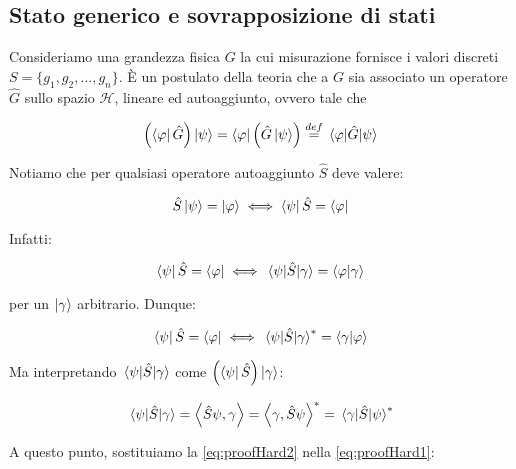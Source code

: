 \subsection{Stato generico e sovrapposizione di stati}

Consideriamo una grandezza fisica $G$ la cui misurazione fornisce i valori discreti $S = \{g_1, g_2, ..., g_n\}$. \`E un postulato della teoria che a $G$ sia associato un operatore $\hat{G}$ sullo spazio $\mathcal{H}$, lineare ed autoaggiunto, ovvero tale che

    \begin{equation}
        \left ( \bra{\varphi} \hat{G} \right ) \ket{\psi} =
        \bra{\varphi} \left ( \hat{G} \ket{\psi} \right ) \overset{def}{=}
        \mel{\varphi}{\hat{G}}{\psi}
    \end{equation}

Notiamo che per qualsiasi operatore autoaggiunto $\hat{S}$ deve valere:
    
    \begin{equation} \label{eq:proofHard0}
        \hat{S} \ket{\psi} = \ket{\varphi} \iff \bra{\psi} \hat{S} = \bra{\varphi}
    \end{equation}
    
Infatti:

    \begin{equation} \label{eq:proofHard1}
        \bra{\psi} \hat{S} = \bra{\varphi} \iff 
        \mel{\psi}{\hat{S}}{\gamma} = \braket{\varphi}{\gamma} 
	\end{equation}

per un $\ket{\gamma}$ arbitrario. Dunque:

	\begin{equation}
		\bra{\psi} \hat{S} = \bra{\varphi} \iff
        \mel{\psi}{\hat{S}}{\gamma}^* = \braket{\gamma}{\varphi}
    \end{equation}  
    
Ma interpretando $\mel{\psi}{\hat{S}}{\gamma}$ come $\left ( \bra{\psi} \hat{S} \right ) \ket{\gamma}$:

    \begin{equation} \label{eq:proofHard2}
        \mel{\psi}{\hat{S}}{\gamma} = \left \langle \hat{S} \psi, \gamma \right \rangle =
        \left \langle \gamma, \hat{S} \psi \right \rangle^* = \mel{\gamma}{\hat{S}}{\psi}^*
    \end{equation}
    
A questo punto, sostituiamo la \eqref{eq:proofHard2} nella \eqref{eq:proofHard1}:

